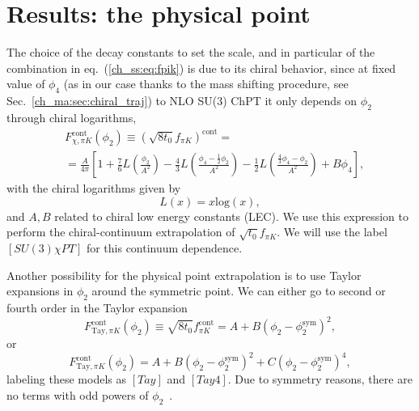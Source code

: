 \section{Results: the physical point}
\label{ch_ss:sec:Results}

The choice of the decay constants to set the scale, and in particular of the combination in eq.~(\ref{ch_ss:eq:fpik}) is due to its chiral behavior, since at fixed value of $\phi_4$ (as in our case thanks to the mass shifting procedure, see Sec.~\ref{ch_ma:sec:chiral_traj}) to NLO SU(3) ChPT it only depends on $\phi_2$ through chiral logarithms, 
\begin{align}
\label{ch_ss:eq:SU3ChPT}
&F_{\chi,\pi K}^{\textrm{cont}}(\phi_2)\equiv\left(\sqrt{8t_0}f_{\pi K}\right)^{\textrm{cont}}=\\
&=\frac{A}{4\pi}\left[1+\frac{7}{6}L\left(\frac{\phi_2}{A^2}\right)-\frac{4}{3}L\left(\frac{\phi_4-\frac{1}{2}\phi_2}{A^2}\right)-\frac{1}{2}L\left(\frac{\frac{4}{3}\phi_4-\phi_2}{A^2}\right)+B\phi_4\right],
\end{align}
with the chiral logarithms given by
\begin{equation}
\label{ch_ss:eq:log}
L(x)=x{\textrm{log}}\left(x\right),
\end{equation}
and $A,B$ related to chiral low energy constants (LEC). We use this expression to perform the chiral-continuum extrapolation of $\sqrt{t_0}f_{\pi K}$. We will use the label $[SU(3)\chi PT]$ for this continuum dependence. 

Another possibility for the physical point extrapolation is to use Taylor expansions in $\phi_2$ around the symmetric point. We can either go to second or fourth order in the Taylor expansion
\begin{equation}
\label{ch_ss:eq:Tay}
F_{\textrm{Tay},\pi K}^{\textrm{cont}}(\phi_2)\equiv\sqrt{8t_0}f_{\pi K}^{\textrm{cont}}=A+B\left(\phi_2-\phi_2^{\textrm{sym}}\right)^2,
\end{equation}
or
\begin{equation}
\label{ch_ss:eq:Tay4}
F_{\textrm{Tay},\pi K}^{\textrm{cont}}(\phi_2)=A+B\left(\phi_2-\phi_2^{\textrm{sym}}\right)^2+C\left(\phi_2-\phi_2^{\textrm{sym}}\right)^4,
\end{equation}
labeling these models as $[Tay]$ and $[Tay4]$. Due to symmetry reasons, there are no terms with odd powers of $\phi_2$~\cite{}.

